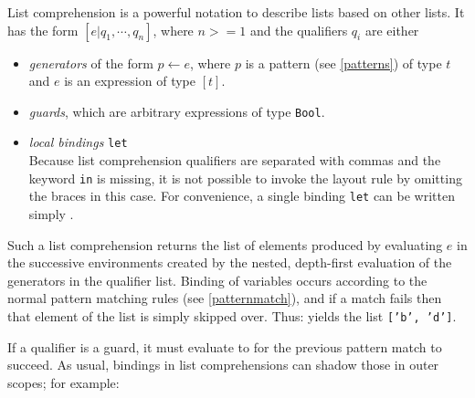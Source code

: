 List comprehension is a powerful notation to describe lists based on other lists. It has the form $[ e | q_1, \cdots, q_n]$, where $n>=1$ and the qualifiers $q_i$ are either
\begin{itemize}
\item \emph{generators} of the form $p \leftarrow{} e$, where $p$ is a pattern (see \autoref{patterns}) of type $t$ and $e$ is an expression of type $[t]$.
\item \emph{guards}, which are arbitrary expressions of type \texttt{Bool}.
\item \emph{local bindings} \texttt{let} \bracea{}  \bracez{}\\
Because list comprehension qualifiers are separated with commas and the keyword \texttt{in} is missing, 
it is not possible to invoke the layout rule by omitting the braces in this case. 
For convenience, a single binding \texttt{let} \bracea{}  \bracez{}
can be written simply .
\end{itemize}

Such a list comprehension returns the list of elements produced by evaluating $e$ in the successive environments created by the nested, depth-first evaluation of the generators in the qualifier list.
Binding of variables occurs according to the normal pattern matching rules (see \autoref{patternmatch}), and if a match fails then that element of the list is simply skipped over.
Thus:
\example{ [ x $|$ (2, x) $\leftarrow{}$ [(1, 'a'), (2, 'b'), (3, 'c'), (2, 'd')] ]}
yields the list \texttt{['b', 'd']}.

If a qualifier is a guard, it must evaluate to  for the previous pattern match to succeed.
As usual, bindings in list comprehensions can shadow those in outer scopes; for example:

